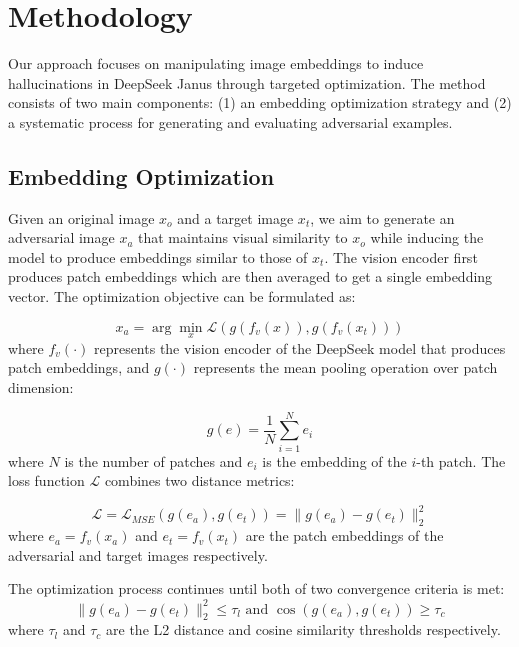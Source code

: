 \documentclass[runningheads]{llncs}
\begin{document}
\section{Methodology}
Our approach focuses on manipulating image embeddings to induce hallucinations in DeepSeek Janus through targeted optimization. The method consists of two main components: (1) an embedding optimization strategy and (2) a systematic process for generating and evaluating adversarial examples.

\subsection{Embedding Optimization}
Given an original image $x_o$ and a target image $x_t$, we aim to generate an adversarial image $x_a$ that maintains visual similarity to $x_o$ while inducing the model to produce embeddings similar to those of $x_t$. The vision encoder first produces patch embeddings which are then averaged to get a single embedding vector. The optimization objective can be formulated as:

\begin{equation}
x_a = \arg\min_{x} \mathcal{L}(g(f_v(x)), g(f_v(x_t)))
\label{eq:main_objective}
\end{equation}
where $f_v(\cdot)$ represents the vision encoder of the DeepSeek model that produces patch embeddings, and $g(\cdot)$ represents the mean pooling operation over patch dimension:

\begin{equation}
g(e) = \frac{1}{N}\sum_{i=1}^N e_i
\end{equation}
where $N$ is the number of patches and $e_i$ is the embedding of the $i$-th patch. The loss function $\mathcal{L}$ combines two distance metrics:

\begin{equation}
\mathcal{L} = \mathcal{L}_{MSE}(g(e_a), g(e_t)) = \|g(e_a) - g(e_t)\|_2^2
\label{eq:mse_loss}
\end{equation}
where $e_a = f_v(x_a)$ and $e_t = f_v(x_t)$ are the patch embeddings of the adversarial and target images respectively. 

The optimization process continues until both of two convergence criteria is met:
\begin{equation}
\|g(e_a) - g(e_t)\|_2^2 \leq \tau_l \text{ and } \cos(g(e_a), g(e_t)) \geq \tau_c
\label{eq:convergence}
\end{equation}
where $\tau_l$ and $\tau_c$ are the L2 distance and cosine similarity thresholds respectively.
\end{document}
